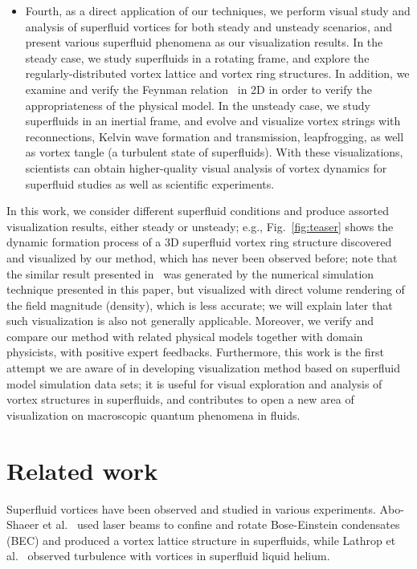 \documentclass[10pt,journal,compsoc,twoside]{IEEEtran}
\begin{document}
\begin{itemize}
		\vspace*{1mm}
		\item
		{
			Fourth, as a direct application of our techniques, we perform visual study and analysis of superfluid vortices for both steady and unsteady scenarios, and present various superfluid phenomena as our visualization results.
			In the steady case, we study superfluids in a rotating frame, and explore the regularly-distributed vortex lattice and vortex ring structures.
			In addition, we examine and verify the Feynman relation~\cite{Feynman-55} in 2D in order to verify the appropriateness of the physical model.
			In the unsteady case, we study superfluids in an inertial frame, and evolve and visualize vortex strings with reconnections, Kelvin wave formation and transmission, leapfrogging, as well as vortex tangle (a turbulent state of superfluids).
			With these visualizations, scientists can obtain higher-quality visual analysis of vortex dynamics for superfluid studies as well as scientific experiments.
		}
	\end{itemize}
	
	In this work, we consider different superfluid conditions and produce assorted visualization results, either steady or unsteady; e.g., Fig.~\ref{fig:teaser} shows the dynamic formation process of a 3D superfluid vortex ring structure discovered and visualized by our method, which has never been observed before; note that the similar result presented in~\cite{PRD_14} was generated by the numerical simulation technique presented in this paper, but visualized with direct volume rendering of the field magnitude (density), which is less accurate; we will explain later that such visualization is also not generally applicable.
	Moreover, we verify and compare our method with related physical models together with domain physicists, with positive expert feedbacks.
	Furthermore, this work is the first attempt we are aware of in developing visualization method based on superfluid model simulation data sets; it is useful for visual exploration and analysis of vortex structures in superfluids, and contributes to open a new area of visualization on macroscopic quantum phenomena in fluids.
	
	
	
	
	\section{Related work} \label{sec:related work}
	
	Superfluid vortices have been observed and studied in various experiments.
	Abo-Shaeer et al.~\cite{Abo-Shaeer_01} used laser beams to confine and rotate Bose-Einstein condensates (BEC) and produced a vortex lattice structure in superfluids, while Lathrop et al.~\cite{Lathrop_06} observed turbulence with vortices in superfluid liquid helium.
\end{document}
